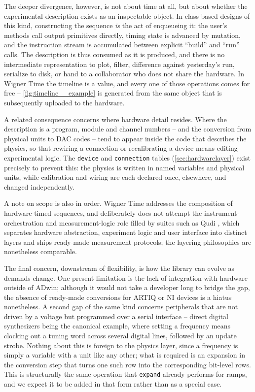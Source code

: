 \documentclass{SciPost}
\newcommand{\python}[1]{%
  \texttt{#1}%
}
\begin{document}
The deeper divergence, however, is not about time at all, but about whether the experimental description exists as an inspectable object. In class-based designs of this kind, constructing the sequence \emph{is} the act of enqueueing it: the user’s methods call output primitives directly, timing state is advanced by mutation, and the instruction stream is accumulated between explicit “build” and “run” calls. The description is thus consumed as it is produced, and there is no intermediate representation to plot, filter, difference against yesterday’s run, serialize to disk, or hand to a collaborator who does not share the hardware. In Wigner Time the timeline is a value, and every one of those operations comes for free – \cref{fig:timeline__example} is generated from the same object that is subsequently uploaded to the hardware.
 
A related consequence concerns where hardware detail resides. Where the description is a program, module and channel numbers – and the conversion from physical units to DAC codes – tend to appear inside the code that describes the physics, so that rewiring a connection or recalibrating a device means editing experimental logic. The \python{device} and \python{connection} tables (\cref{sec:hardwarelayer}) exist precisely to prevent this: the physics is written in named variables and physical units, while calibration and wiring are each declared once, elsewhere, and changed independently.
 
A note on scope is also in order. Wigner Time addresses the composition of hardware-timed sequences, and deliberately does not attempt the instrument-orchestration and measurement-logic role filled by suites such as Qudi \cite{binder2017qudi}, which separates hardware abstraction, experiment logic and user interface into distinct layers and ships ready-made measurement protocols; the layering philosophies are nonetheless comparable.
 
The final concern, downstream of flexibility, is how the library can evolve as demands change. One present limitation is the lack of integration with hardware outside of ADwin; although it would not take a developer long to bridge the gap, the absence of ready-made conversions for ARTIQ or NI devices is a hiatus nonetheless. A second gap of the same kind concerns peripherals that are not driven by a voltage but programmed over a serial interface – direct digital synthesizers being the canonical example, where setting a frequency means clocking out a tuning word across several digital lines, followed by an update strobe. Nothing about this is foreign to the physics layer, since a frequency is simply a variable with a unit like any other; what is required is an expansion in the conversion step that turns one such row into the corresponding bit-level rows. This is structurally the same operation that \python{expand} already performs for ramps, and we expect it to be added in that form rather than as a special case.
 
\end{document}
